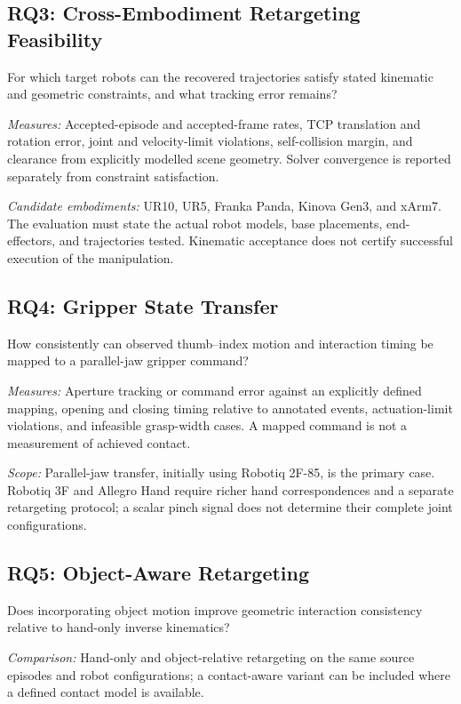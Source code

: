 \subsection*{RQ3: Cross-Embodiment Retargeting Feasibility}

For which target robots can the recovered trajectories satisfy stated
kinematic and geometric constraints, and what tracking error remains?

\textit{Measures:} Accepted-episode and accepted-frame rates, TCP translation
and rotation error, joint and velocity-limit violations, self-collision
margin, and clearance from explicitly modelled scene geometry. Solver
convergence is reported separately from constraint satisfaction.

\textit{Candidate embodiments:} UR10, UR5, Franka Panda, Kinova Gen3, and
xArm7. The evaluation must state the actual robot models, base placements,
end-effectors, and trajectories tested. Kinematic acceptance does not certify
successful execution of the manipulation.

\subsection*{RQ4: Gripper State Transfer}

How consistently can observed thumb--index motion and interaction timing be
mapped to a parallel-jaw gripper command?

\textit{Measures:} Aperture tracking or command error against an explicitly
defined mapping, opening and closing timing relative to annotated events,
actuation-limit violations, and infeasible grasp-width cases. A mapped
command is not a measurement of achieved contact.

\textit{Scope:} Parallel-jaw transfer, initially using Robotiq 2F-85, is the
primary case. Robotiq 3F and Allegro Hand require richer hand correspondences
and a separate retargeting protocol; a scalar pinch signal does not determine
their complete joint configurations.

\subsection*{RQ5: Object-Aware Retargeting}

Does incorporating object motion improve geometric interaction consistency
relative to hand-only inverse kinematics?

\textit{Comparison:} Hand-only and object-relative retargeting on the same
source episodes and robot configurations; a contact-aware variant can be
included where a defined contact model is available.

